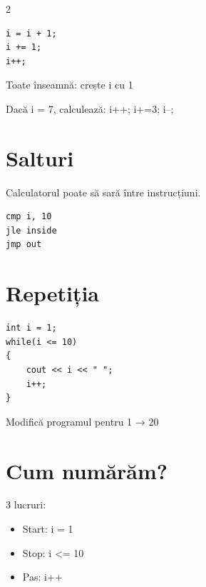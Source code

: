 \documentclass[11pt]{article}
\begin{document}
\begin{multicols}{2}
\begin{examplebox}
\begin{lstlisting}
i = i + 1;
i += 1;
i++;
\end{lstlisting}
Toate înseamnă: crește i cu 1
\end{examplebox}

\begin{trybox}
Dacă i = 7, calculează:
i++; i+=3; i--;
\end{trybox}

\section*{Salturi}

\begin{theorybox}
Calculatorul poate să sară între instrucțiuni.
\end{theorybox}

\begin{examplebox}
\begin{lstlisting}
cmp i, 10
jle inside
jmp out
\end{lstlisting}
\end{examplebox}

\section*{Repetiția}

\begin{examplebox}
\begin{lstlisting}
int i = 1;
while(i <= 10)
{
    cout << i << " ";
    i++;
}
\end{lstlisting}
\end{examplebox}

\begin{trybox}
Modifică programul pentru 1 → 20
\end{trybox}

\section*{Cum numărăm?}

\begin{theorybox}
3 lucruri:
\begin{itemize}
\item Start: i = 1
\item Stop: i <= 10
\item Pas: i++
\end{itemize}
\end{theorybox}


\end{multicols}
\end{document}
